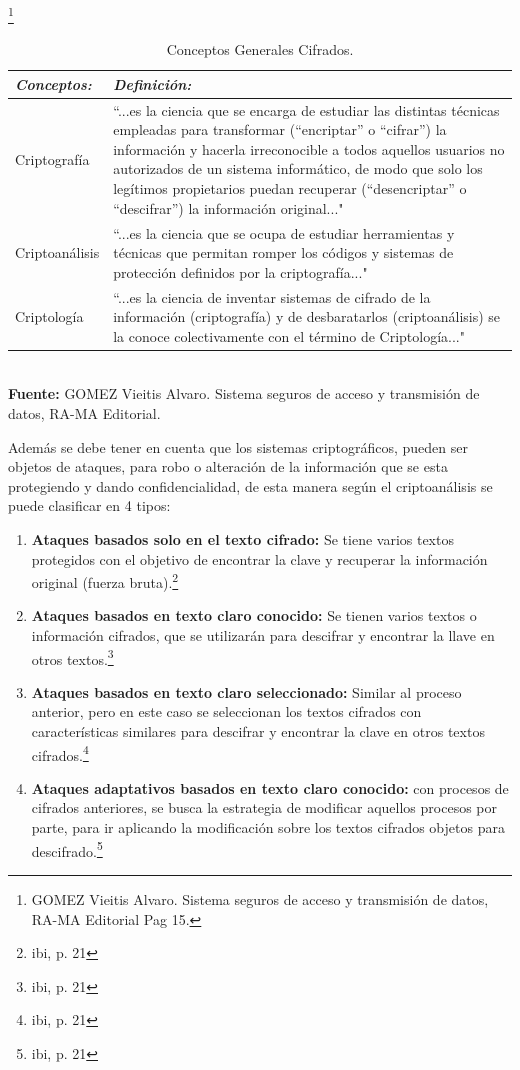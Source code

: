 \documentclass[a4paper,openright,12pt]{book}
\theoremstyle{definition}
\theoremstyle{remark}
\begin{document}
\begin{table}[ht]
\centering
\caption{Conceptos Generales Cifrados.}\footnote{GOMEZ Vieitis Alvaro. Sistema seguros de acceso y transmisión de datos, RA-MA Editorial Pag 15.}
\begin{tabular}{>{\centering\arraybackslash}m{3cm} >{\arraybackslash}m{9cm} }
\hline
\textbf{\textit{Conceptos:}} & \textbf{\textit{Definición:}} \\ \hline
Criptografía & “...es la ciencia que se encarga de estudiar las distintas técnicas empleadas para transformar (“encriptar” o “cifrar”) la información y hacerla irreconocible a todos aquellos usuarios no autorizados de un sistema informático, de modo que solo los legítimos propietarios puedan recuperar (“desencriptar” o “descifrar”) la información original..." \\ \hline
Criptoanálisis & “...es la ciencia que se ocupa de estudiar herramientas y técnicas que permitan romper los códigos y sistemas de protección definidos por la criptografía..." \\ \hline
Criptología & “...es la ciencia de inventar sistemas de cifrado de la información (criptografía) y de desbaratarlos (criptoanálisis) se la conoce colectivamente con el término de Criptología..." \\ \hline
\end{tabular}
\label{tabla:ConceptosCriptograficos}
\\\textbf{Fuente:} GOMEZ Vieitis Alvaro. Sistema seguros de acceso y transmisión de datos, RA-MA Editorial.
\end{table}

Además se debe tener en cuenta que los sistemas criptográficos, pueden ser objetos de ataques, para robo o alteración de la información que se esta protegiendo y dando confidencialidad, de esta manera según el criptoanálisis se puede clasificar en 4 tipos:

\begin{enumerate}
	\item \textbf{Ataques basados solo en el texto cifrado:}  Se tiene varios textos protegidos con el objetivo de encontrar la clave y recuperar la información original (fuerza bruta).\footnote{ibi, p. 21}
    \item \textbf{Ataques basados en texto claro conocido:} Se tienen varios textos o información cifrados, que se utilizarán para descifrar y encontrar la llave en otros textos.\footnote{ibi, p.  21}
    \item \textbf{Ataques basados en texto claro seleccionado:} Similar al proceso anterior, pero en este caso se seleccionan los textos cifrados con características similares para descifrar y encontrar la clave en otros textos cifrados.\footnote{ibi, p. 21}
    \item \textbf{Ataques adaptativos basados en texto claro conocido: } con procesos de cifrados anteriores, se busca la estrategia de modificar aquellos procesos por parte, para ir aplicando la modificación sobre los textos cifrados objetos para descifrado.\footnote{ibi, p. 21}
\end{enumerate}
\end{document}

